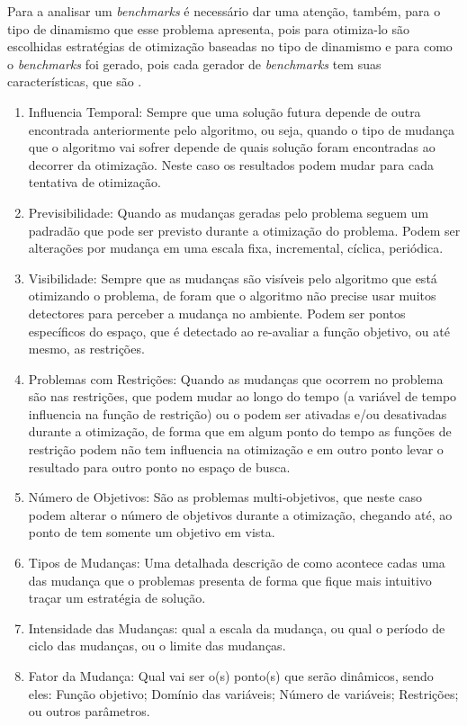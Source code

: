 Para a analisar um \textit{benchmarks} é necessário dar uma atenção, também, para o tipo de dinamismo que esse problema apresenta, pois para otimiza-lo são escolhidas estratégias de otimização baseadas no tipo de dinamismo e para como o \textit{benchmarks} foi gerado, pois cada gerador de \textit{benchmarks} tem suas características, que são \cite{cruz2011optimization}.

\begin{enumerate}
\item Influencia Temporal: Sempre que uma solução futura depende de outra encontrada anteriormente pelo algoritmo, ou seja, quando o tipo de mudança que o algoritmo vai sofrer depende de quais solução foram encontradas ao decorrer da otimização. Neste caso os resultados podem mudar para cada tentativa de otimização.

\item Previsibilidade: Quando as mudanças geradas pelo problema seguem um padradão que pode ser previsto durante a otimização do problema. Podem ser alterações por mudança em uma escala fixa, incremental, cíclica, periódica.

\item Visibilidade: Sempre que as mudanças são visíveis pelo algoritmo que está otimizando o problema, de foram que o algoritmo não precise usar muitos detectores para perceber a mudança no ambiente. Podem ser pontos específicos do espaço, que é detectado ao re-avaliar a função objetivo, ou até mesmo, as restrições.

\item Problemas com Restrições: Quando as mudanças que ocorrem no problema são nas restrições, que podem mudar ao longo do tempo (a variável de tempo influencia na função de restrição) ou o podem ser ativadas e/ou desativadas durante a otimização, de forma que em algum ponto do tempo as funções de restrição podem não tem influencia na otimização e em outro ponto levar o resultado para outro ponto no espaço de busca.

\item Número de Objetivos: São as problemas multi-objetivos, que neste caso podem alterar o número de objetivos durante a otimização, chegando até, ao ponto de tem somente um objetivo em vista.

\item Tipos de Mudanças: Uma detalhada descrição de como acontece cadas uma das mudança que o problemas presenta de forma que fique mais intuitivo traçar um estratégia de solução.

\item Intensidade das Mudanças: qual a escala da mudança, ou qual o período de ciclo das mudanças, ou o limite das mudanças.

\item Fator da Mudança: Qual vai ser o(s) ponto(s) que serão dinâmicos, sendo eles: Função objetivo; Domínio das variáveis; Número de variáveis; Restrições; ou outros parâmetros.  
\end{enumerate}

